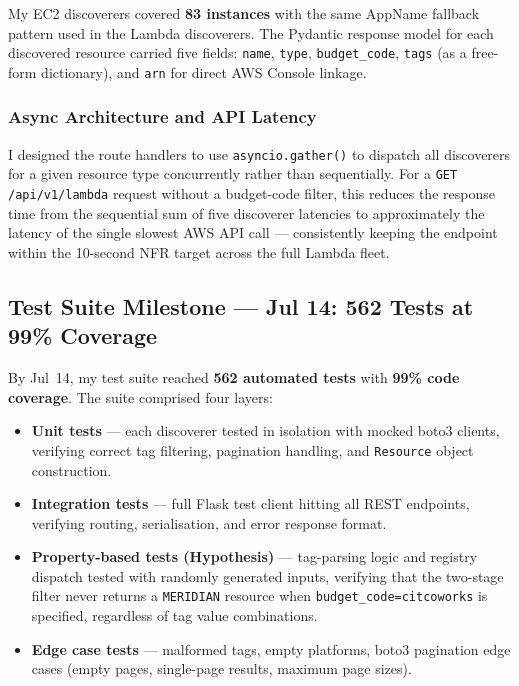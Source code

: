 My EC2 discoverers covered \textbf{83 instances} with the same AppName fallback
pattern used in the Lambda discoverers. The Pydantic response model for each
discovered resource carried five fields: \texttt{name}, \texttt{type},
\texttt{budget\_code}, \texttt{tags} (as a free-form dictionary), and
\texttt{arn} for direct AWS Console linkage.

\subsubsection{Async Architecture and API Latency}

I designed the route handlers to use \texttt{asyncio.gather()} to dispatch all discoverers for
a given resource type concurrently rather than sequentially. For a
\texttt{GET /api/v1/lambda} request without a budget-code filter, this reduces
the response time from the sequential sum of five discoverer latencies to
approximately the latency of the single slowest AWS API call --- consistently
keeping the endpoint within the 10-second NFR target across the full Lambda fleet.

\subsection{Test Suite Milestone --- Jul 14: 562 Tests at 99\% Coverage}

By Jul~14, my test suite reached \textbf{562 automated tests} with
\textbf{99\% code coverage}. The suite comprised four layers:

\begin{itemize}
    \item \textbf{Unit tests} --- each discoverer tested in isolation with mocked
          boto3 clients, verifying correct tag filtering, pagination handling, and
          \texttt{Resource} object construction.
    \item \textbf{Integration tests} --- full Flask test client hitting all REST
          endpoints, verifying routing, serialisation, and error response format.
    \item \textbf{Property-based tests (Hypothesis)} --- tag-parsing logic and
          registry dispatch tested with randomly generated inputs, verifying that
          the two-stage filter never returns a \texttt{MERIDIAN} resource when
          \texttt{budget\_code=citcoworks} is specified, regardless of tag value
          combinations.
    \item \textbf{Edge case tests} --- malformed tags, empty platforms,
          boto3 pagination edge cases (empty pages, single-page results, maximum
          page sizes).
\end{itemize}

